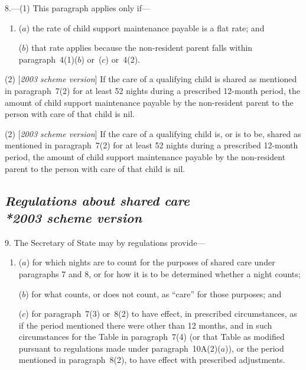 \documentclass[12pt,a4paper]{article}
\begin{document}
8.---(1) This paragraph applies only if—
\begin{enumerate}\item[]
($a$) the rate of child support maintenance payable is a flat rate; and

($b$) that rate applies because the non-resident parent falls within paragraph~4(1)($b$)  or~($c$)  or~4(2).
\end{enumerate}

(2) [\emph{2003 scheme version}] If the care of a qualifying child is shared as mentioned in paragraph~7(2)  for at least 52 nights during a prescribed 12-month period, the amount of child support maintenance payable by the non-resident parent to the person with care of that child is nil.

(2) [\emph{2003 scheme version}] 
If the care of a qualifying child is, or is to be, shared  %
as mentioned in paragraph~7(2)  for at least 52 nights during a prescribed 12-month period, the amount of child support maintenance payable by the non-resident parent to the person with care of that child is nil.


\subsection*{\itshape Regulations about shared care\\*\emph{2003 scheme version}}

9. The Secretary of State may by regulations provide—
\begin{enumerate}\item[]
($a$) for which nights are to count for the purposes of shared care under paragraphs 7 and 8, or for how it is to be determined whether a night counts;

($b$) for what counts, or does not count, as “care” for those purposes; and

($c$) for paragraph~7(3)  or~8(2)  to have effect, in prescribed circumstances, as if the period mentioned there were other than 12 months, and in such circumstances for the Table in paragraph~7(4)  (or that Table as modified pursuant to regulations made under paragraph~10A(2)($a$)), or the period mentioned in paragraph~8(2), to have effect with prescribed adjustments.
\end{enumerate}
\end{document}
